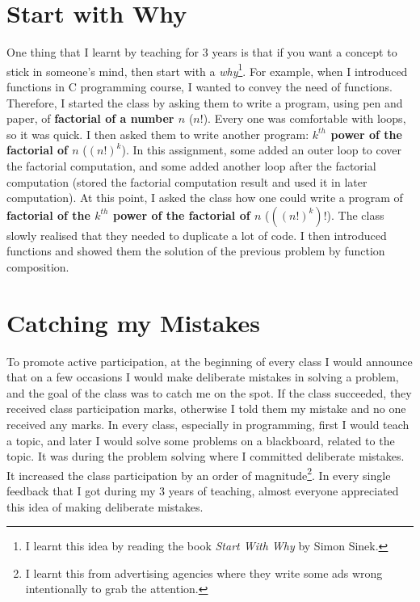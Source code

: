 \documentclass[a4paper]{article}
\begin{document}
\section{Start with Why}
One thing that I learnt by teaching for 3 years is that if you want a concept 
to stick in someone's mind, then start with a \textit{why}\footnote{I learnt this idea by reading the book 
\textit{Start With Why} by Simon Sinek.}. For example, when I introduced functions 
in C programming course, I wanted to convey the need of functions. Therefore, I started the class by 
asking them to write a program, using pen and paper, of \textbf{factorial of a number $n$} ($n!$). 
Every one was comfortable with loops, so it was quick. I then asked them to write 
another program: \textbf{$k^{th}$ power of the factorial of $n$} ($(n!)^k$). 
In this assignment, some added an outer loop to cover the factorial computation, 
and some added another loop after the factorial computation (stored the factorial 
computation result and used it in later computation). 
At this point, I asked the class 
how one could write a program of \textbf{factorial of 
the $k^{th}$ power of the factorial of $n$} ($((n!)^k)!$). The class slowly realised 
that they needed to duplicate a lot of code. I then introduced functions 
and showed them the solution of the previous problem by function composition.


\section{Catching my Mistakes}
To promote active participation, at the beginning of every class I would announce that 
on a few occasions I would make deliberate mistakes in solving a problem, and the
goal of the class was to catch me on the spot.
If the class succeeded, they received  
class participation marks, otherwise I told them my 
mistake and no one received any marks.
In every class, especially in programming, 
first I would teach a topic, and later I would solve some problems on 
a blackboard, related to the topic. 
It was during the problem solving where I committed deliberate mistakes.
It increased the class participation by an order of 
magnitude\footnote{I learnt this 
from advertising agencies where they write some ads wrong 
intentionally to grab the attention.}. In every single 
feedback that I got during my 3 years of teaching, 
almost everyone appreciated this idea of making deliberate mistakes. 
\end{document}

